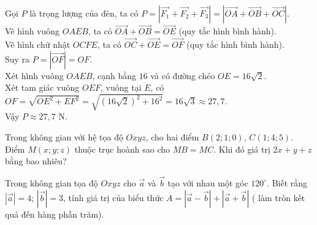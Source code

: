 \begin{ex}
{\begin{center}
\end{center}
Gọi $P$ là trọng lượng của đèn, ta có $P=\left|\overrightarrow{F_1}+\overrightarrow{F_2}+\overrightarrow{F_3}\right|=\left|\overrightarrow{OA}+\overrightarrow{OB}+\overrightarrow{OC}\right|$.\\
Vẽ hình vuông $OAEB$, ta có $\overrightarrow{OA}+\overrightarrow{OB}=\overrightarrow{OE}$ (quy tắc hình bình hành).\\
Vẽ hình chữ nhật $OCFE$, ta có $\overrightarrow{OC}+\overrightarrow{OE}=\overrightarrow{OF}$ (quy tắc hình bình hành).\\
Suy ra $P=\left|\overrightarrow{OF}\right|=OF$.\\
Xét hình vuông $OAEB$, cạnh bằng $16$ và có đường chéo $OE=16\sqrt{2}$.\\
Xét tam giác vuông $OEF$, vuông tại $E$, có $OF=\sqrt{OE^2+EF^2}=\sqrt{\left(16\sqrt{2}\right)^2+16^2}=16\sqrt{3}\approx 27{,}7$.\\
Vậy $P\approx 27{,}7$ N.
 }
\end{ex}

\begin{ex}%
Trong không gian với hệ tọa độ $Oxyz$, cho hai điểm $B(2; 1; 0)$, $C(1; 4; 5)$. Điểm $M(x; y; z)$ thuộc trục hoành sao cho $MB=MC$. Khi đó giá trị $2x+y+z$ bằng bao nhiêu?
\end{ex}

\begin{ex}%
Trong không gian tọa độ $Oxyz$ cho $\overrightarrow{a}$ và $\overrightarrow{b}$ tạo với nhau một góc $120^{\circ}$. Biết rằng $|\overrightarrow{a}|=4$; $|\overrightarrow{b}|=3$, tính giá trị của biểu thức $A=|\overrightarrow{a}-\overrightarrow{b}|+|\overrightarrow{a}+\overrightarrow{b}|$ ( làm tròn kết quả đến hàng phần trăm).

\end{ex}


